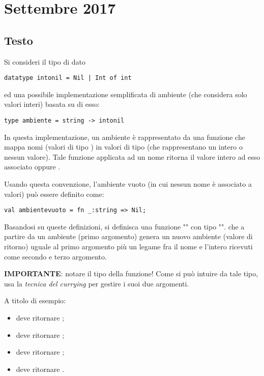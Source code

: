 \section{Settembre 2017}

\subsection{Testo}

Si consideri il tipo di dato
\begin{lstlisting}[style = SML]
datatype intonil = Nil | Int of int
\end{lstlisting}

ed una possibile implementazione semplificata di ambiente (che considera solo valori interi) basata su di esso:
\begin{lstlisting}[style = SML]
type ambiente = string -> intonil
\end{lstlisting}

In questa implementazione, un ambiente è rappresentato da una funzione che mappa nomi (valori di tipo ) in valori di tipo  (che rappresentano un intero o nessun valore). Tale funzione applicata ad un nome ritorna il valore intero ad esso associato oppure .

\medskip
Usando questa convenzione, l'ambiente vuoto (in cui nessun nome è associato a valori) può essere definito come:
\begin{lstlisting}
val ambientevuoto = fn _:string => Nil;
\end{lstlisting}

Basandosi su queste definizioni, si definisca una funzione "" con tipo "". che a partire da un ambiente (primo argomento) genera un nuovo ambiente (valore di ritorno) uguale al primo argomento più un legame fra il nome e l'intero ricevuti come secondo e terzo argomento.

\medskip
\textbf{IMPORTANTE}: notare il tipo della funzione! Come si può intuire da tale tipo, usa la \emph{tecnica del currying} per gestire i suoi due argomenti.

\medskip
A titolo di esempio:

\begin{itemize}
  \item {} deve ritornare ;
  \item {} deve ritornare ;
  \item {} deve ritornare ;
  \item {} deve ritornare .
\end{itemize}

